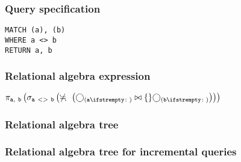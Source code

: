 \subsubsection*{Query specification}

\begin{lstlisting}
MATCH (a), (b)
WHERE a <> b
RETURN a, b
\end{lstlisting}

\subsubsection*{Relational algebra expression}

$\projection{\var{a},~\var{b}} \left(\selection{\mathtt{a~<>~b}} \left(\alldifferent{} \left(\getvertices{a}{} \join \{\} \getvertices{b}{}\right)\right)\right)$

\subsubsection*{Relational algebra tree}


\subsubsection*{Relational algebra tree for incremental queries}


